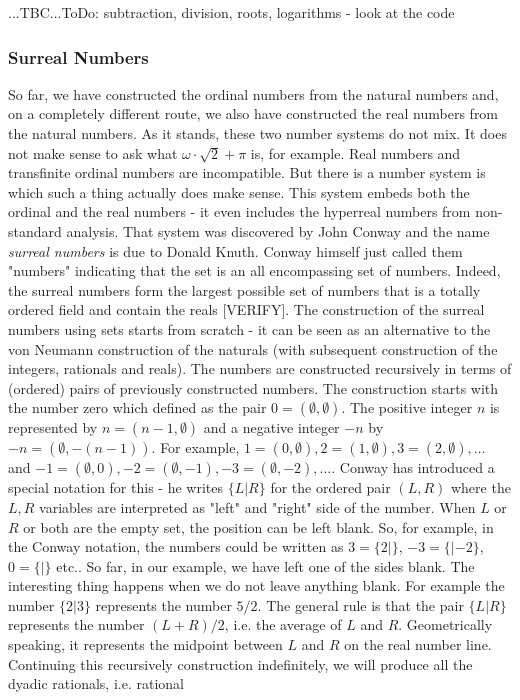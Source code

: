 ...TBC...ToDo: subtraction, division, roots, logarithms - look at the code







\subsubsection{Surreal Numbers}
So far, we have constructed the ordinal numbers from the natural numbers and, on a completely different route, we also have constructed the real numbers from the natural numbers. As it stands, these two number systems do not mix. It does not make sense to ask what $\omega \cdot \sqrt{2} + \pi$ is, for example. Real numbers and transfinite ordinal numbers are incompatible. But there is a number system is which such a thing actually does make sense. This system embeds both the ordinal and the real numbers - it even includes the hyperreal numbers from non-standard analysis. That system was discovered by John Conway and the name \emph{surreal numbers} is due to Donald Knuth. Conway himself just called them "numbers" indicating that the set is an all encompassing set of numbers. Indeed, the surreal numbers form the largest possible set of numbers that is a totally ordered field and contain the reals [VERIFY]. The construction of the surreal numbers using sets starts from scratch - it can be seen as an alternative to the von Neumann construction of the naturals (with subsequent construction of the integers, rationals and reals). The numbers are constructed recursively in terms of (ordered) pairs of previously constructed numbers. The construction starts with the number zero which defined as the pair $0 = (\emptyset, \emptyset)$. The positive integer $n$ is represented by $n = (n-1,\emptyset)$ and a negative integer $-n$ by $-n = (\emptyset, -(n-1))$. For example, $1=(0,\emptyset), 2=(1,\emptyset), 3=(2,\emptyset), \ldots$ and $-1=(\emptyset,0), -2=(\emptyset,-1), -3=(\emptyset,-2), \ldots$. Conway has introduced a special notation for this - he writes $\{L|R\}$ for the ordered pair $(L,R)$ where the $L,R$ variables are interpreted as "left" and "right" side of the number. When $L$ or $R$ or both are the empty set, the position can be left blank. So, for example, in the Conway notation, the numbers could be written as $3=\{2|\}$, $-3=\{|-2\}$,  $0=\{|\}$ etc.. So far, in our example, we have left one of the sides blank. The interesting thing happens when we do not leave anything blank. For example the number $\{2|3\}$ represents the number $5/2$. The general rule is that the pair $\{L|R\}$ represents the number $(L+R)/2$, i.e. the average of $L$ and $R$. Geometrically speaking, it represents the midpoint between $L$ and $R$ on the real number line. Continuing this recursively construction indefinitely, we will produce all the dyadic rationals, i.e. rational 